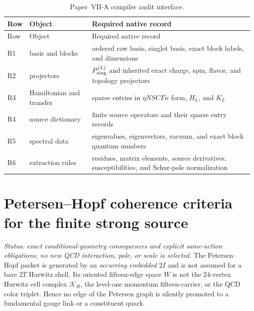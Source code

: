 \documentclass[12pt,a4paper]{article}
\begin{document}
\begin{longtable}{>{\raggedright\arraybackslash}p{} >{\raggedright\arraybackslash}p{} >{\raggedright\arraybackslash}p{}}
\caption[Paper-VII-A compiler audit interface]{Paper~VII-A compiler audit interface.}\label{p10:tab:executable-finite-qcd-transcript-schema}\\
\toprule
Row & Object & Required native record \\
\midrule
\endfirsthead
\toprule
Row & Object & Required native record \\
\midrule
\endhead
R1 & basis and blocks & ordered raw basis, singlet basis, exact block labels, and dimensions \\
R2 & projectors & \(P_{\rm sing}^{(L)}\) and inherited exact charge, spin, flavor, and topology projectors \\
R3 & Hamiltonian and transfer & sparse entries in \(\eta NSCF\kappa\) form, \(H_L\), and \(K_L\) \\
R4 & source dictionary & finite source operators and their sparse entry records \\
R5 & spectral data & eigenvalues, eigenvectors, vacuum, and exact block quantum numbers \\
R6 & extraction rules & residues, matrix elements, source derivatives, susceptibilities, and Schur-pole normalization \\
\bottomrule
\end{longtable}



\section{Petersen--Hopf coherence criteria for the finite strong source}
\label{p10:sec:v323-petersen-strong-source}
\noindent\textit{Status: exact conditional-geometry consequences and explicit
same-action obligations; no new QCD interaction, pole, or scale is selected.}
The Petersen--Hopf packet is generated by an \emph{occurring embedded}
$2I$ and is not assumed for a bare $2T$ Hurwitz shell.  Its oriented
fifteen-edge space $W$ is not the $24$-vertex Hurwitz cell complex
$\mathcal K_H$, the level-one momentum fifteen-carrier, or the QCD color
triplet.  Hence no edge of the Petersen graph is silently promoted to a
fundamental gauge link or a constituent quark.
\end{document}
